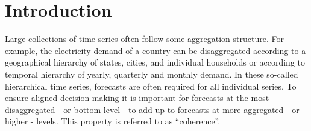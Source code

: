 \documentclass[a4paper, 11pt]{article}
\theoremstyle{theo}
\theoremstyle{definition}
\begin{document}
\section{Introduction}\label{sec:intro}

Large collections of time series often follow some aggregation structure.  For example, the electricity demand of a country can be disaggregated according to a geographical hierarchy of states, cities, and individual households or according to temporal hierarchy of yearly, quarterly and monthly demand. In these so-called hierarchical time series, forecasts are often required for all individual series.  To ensure aligned decision making it is important for forecasts at the most disaggregated - or bottom-level - to add up to forecasts at more aggregated - or higher - levels. This property is referred to as ``coherence''.
\end{document}
